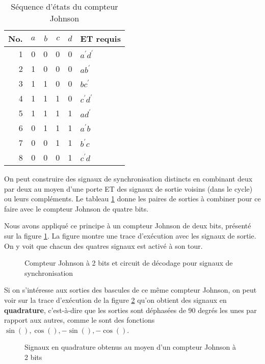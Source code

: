 \documentclass[11pt]{article}
\begin{document}
\begin{table}[htbp]
\caption{\label{tab:org4a8f263}Séquence d'états du compteur Johnson}
\centering
\begin{tabular}{rrrrrl}
No. & \(a\) & \(b\) & \(c\) & \(d\) & ET requis\\
\hline
1 & 0 & 0 & 0 & 0 & \(a^\prime d^\prime\)\\
2 & 1 & 0 & 0 & 0 & \(a b^\prime\)\\
3 & 1 & 1 & 0 & 0 & \(b c^\prime\)\\
4 & 1 & 1 & 1 & 0 & \(c^\prime d^\prime\)\\
5 & 1 & 1 & 1 & 1 & \(a d^\prime\)\\
6 & 0 & 1 & 1 & 1 & \(a^\prime b\)\\
7 & 0 & 0 & 1 & 1 & \(b^\prime c\)\\
8 & 0 & 0 & 0 & 1 & \(c^\prime d\)\\
\end{tabular}
\end{table}


On peut construire des signaux de synchronisation distincts en
combinant deux par deux au moyen d'une porte ET des signaux de sortie
voisins (dans le cycle) ou leurs compléments. Le tableau \ref{tab:org4a8f263}
donne les paires de sorties à combiner pour ce faire avec le compteur
Johnson de quatre bits.

Nous avons appliqué ce principe à un compteur Johnson de deux bits,
présenté sur la figure \ref{fig:org9818d46}. La figure montre une trace
d'exécution avec les signaux de sortie. On y voit que chacun des
quatres signaux est activé à son tour.

\begin{figure}[htbp]
\centering

\caption{\label{fig:org9818d46}Compteur Johnson à 2 bits et circuit de décodage pour signaux de synchronisation}
\end{figure}

Si on s'intéresse aux sorties des bascules de ce même compteur
Johnson, on peut voir sur la trace d'exécution de la figure
\ref{fig:org4d12c7f} qu'on obtient des signaux en \textbf{quadrature},
c'est-à-dire que les sorties sont déphasées de 90 degrés les unes par
rapport aux autres, comme le sont des fonctions \(\sin(), \cos(),
-\sin(), -\cos()\).

\begin{figure}[htbp]
\centering

\caption{\label{fig:org4d12c7f}Signaux en quadrature obtenus au moyen d'un compteur Johnson à 2 bits}
\end{figure} 
\end{document}
